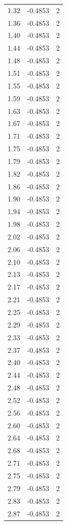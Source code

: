 \begin{longtable}{lrr}
  1.32 & -0.4853 & 2 \\
  1.36 & -0.4853 & 2 \\
  1.40 & -0.4853 & 2 \\
  1.44 & -0.4853 & 2 \\
  1.48 & -0.4853 & 2 \\
  1.51 & -0.4853 & 2 \\
  1.55 & -0.4853 & 2 \\
  1.59 & -0.4853 & 2 \\
  1.63 & -0.4853 & 2 \\
  1.67 & -0.4853 & 2 \\
  1.71 & -0.4853 & 2 \\
  1.75 & -0.4853 & 2 \\
  1.79 & -0.4853 & 2 \\
  1.82 & -0.4853 & 2 \\
  1.86 & -0.4853 & 2 \\
  1.90 & -0.4853 & 2 \\
  1.94 & -0.4853 & 2 \\
  1.98 & -0.4853 & 2 \\
  2.02 & -0.4853 & 2 \\
  2.06 & -0.4853 & 2 \\
  2.10 & -0.4853 & 2 \\
  2.13 & -0.4853 & 2 \\
  2.17 & -0.4853 & 2 \\
  2.21 & -0.4853 & 2 \\
  2.25 & -0.4853 & 2 \\
  2.29 & -0.4853 & 2 \\
  2.33 & -0.4853 & 2 \\
  2.37 & -0.4853 & 2 \\
  2.40 & -0.4853 & 2 \\
  2.44 & -0.4853 & 2 \\
  2.48 & -0.4853 & 2 \\
  2.52 & -0.4853 & 2 \\
  2.56 & -0.4853 & 2 \\
  2.60 & -0.4853 & 2 \\
  2.64 & -0.4853 & 2 \\
  2.68 & -0.4853 & 2 \\
  2.71 & -0.4853 & 2 \\
  2.75 & -0.4853 & 2 \\
  2.79 & -0.4853 & 2 \\
  2.83 & -0.4853 & 2 \\
  2.87 & -0.4853 & 2 \\

\end{longtable}

